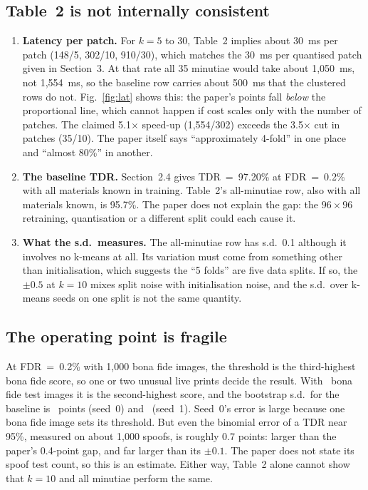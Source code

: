 \IfFileExists{IEEEtran.cls}{\documentclass[conference]{IEEEtran}}{\documentclass[twocolumn,10pt]{article}}
\begin{document}
\subsection{Table~2 is not internally consistent}
\begin{enumerate}
\item \textbf{Latency per patch.} For $k=5$ to 30, Table~2 implies about 30~ms per patch (148/5, 302/10,
910/30), which matches the 30~ms per quantised patch given in Section~3. At that rate all 35 minutiae
would take about 1,050~ms, not 1,554~ms, so the baseline row carries about 500~ms that the clustered rows
do not. Fig.~\ref{fig:lat} shows this: the paper's points fall \emph{below} the proportional line, which
cannot happen if cost scales only with the number of patches. The claimed 5.1$\times$ speed-up
(1,554/302) exceeds the 3.5$\times$ cut in patches (35/10). The paper itself says ``approximately
4-fold'' in one place and ``almost 80\%'' in another.
\item \textbf{The baseline TDR.} Section~2.4 gives TDR~=~97.20\% at FDR~=~0.2\% with all materials
known in training. Table~2's all-minutiae row, also with all materials known, is 95.7\%. The paper does
not explain the gap: the $96\times96$ retraining, quantisation or a different split could each cause it.
\item \textbf{What the s.d.\ measures.} The all-minutiae row has s.d.\ 0.1 although it involves no k-means
at all. Its variation must come from something other than initialisation, which suggests the ``5 folds''
are five data splits. If so, the $\pm0.5$ at $k=10$ mixes split noise with initialisation noise, and the
s.d.\ over k-means seeds on one split is not the same quantity.
\end{enumerate}

\subsection{The operating point is fragile}
At FDR~=~0.2\% with 1,000 bona fide images, the threshold is the third-highest bona fide score, so one or
two unusual live prints decide the result. With \NTestBona\ bona fide test images it is the
second-highest score, and the bootstrap s.d.\ for the baseline is \TDRallBootSD\ points (seed~0) and
\TDRallBootSDSeedOne\ (seed~1). Seed~0's error is large because one bona fide image sets its threshold.
But even the binomial error of a TDR near 95\%, measured on about 1,000 spoofs, is roughly 0.7 points:
larger than the paper's 0.4-point gap, and far larger than its $\pm0.1$. The paper does not state its
spoof test count, so this is an estimate. Either way, Table~2 alone cannot show that $k=10$ and all
minutiae perform the same.
\end{document}
